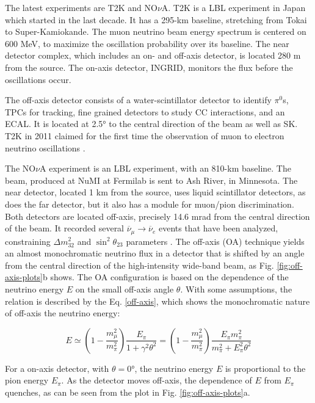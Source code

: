 The latest experiments are T2K and NO$\nu$A. T2K is a LBL experiment in Japan which started in the last decade. It has a 295-km baseline, stretching from Tokai to Super-Kamiokande. The muon neutrino beam energy spectrum is centered on 600 MeV, to maximize the oscillation probability over its baseline. The near detector complex, which includes an on- and off-axis detector, is located 280 m from the source. The on-axis detector, INGRID, monitors the flux before the oscillations occur. 

The off-axis detector consists of a water-scintillator detector to identify $\pi^0$s, TPCs for tracking, fine grained detectors to study CC interactions, and an ECAL. It is located at 2.5° to the central direction of the beam as well as SK. T2K in 2011 claimed for the first time the observation of muon to electron neutrino oscillations \cite{T2K}. 

The NO$\nu$A experiment is an LBL experiment, with an 810-km baseline. The beam, produced at NuMI at Fermilab is sent to Ash River, in Minnesota. The near detector, located 1 km from the source, uses liquid scintillator detectors, as does the far detector, but it also has a module for muon/pion discrimination. Both detectors are located off-axis, precisely 14.6 mrad from the central direction of the beam. It recorded several $\overline{\nu}_\mu \rightarrow \overline{\nu}_e$ events that have been analyzed, constraining $\Delta m^2_{32}$ and $\sin^2 \theta_{23}$ parameters \cite{NOVA}.
The off-axis (OA) technique yields an almost monochromatic neutrino flux in a detector that is shifted by an angle from the central direction of the high-intensity wide-band beam, as Fig. \ref{fig:off-axis-plots}b shows. The OA configuration is based on the dependence of the neutrino energy $E$ on the small off-axis angle $\theta$. With some assumptions, the relation is described by the Eq. \ref{off-axis}, which shows the monochromatic nature of off-axis the neutrino energy:

\begin{equation}
\label{off-axis}
    E \simeq \left(1-\frac{m^2_\mu}{m^2_\pi}\right)\frac{E_\pi}{1+\gamma^2\theta^2} = \left(1-\frac{m^2_\mu}{m^2_\pi}\right)\frac{E_\pi m^2_\pi}{m^2_\pi + E^2_\pi \theta^2}
\end{equation}

For a on-axis detector, with $\theta = 0$°, the neutrino energy $E$ is proportional to the pion energy $E_\pi$. As the detector moves off-axis, the dependence of $E$ from $E_\pi$ quenches, as can be seen from the plot in Fig. \ref{fig:off-axis-plots}a.

